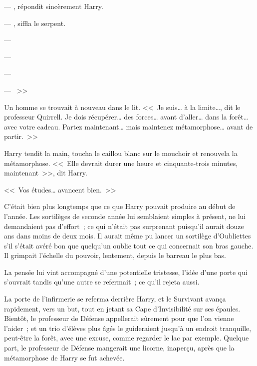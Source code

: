 --- , répondit sincèrement Harry.

--- , siffla le serpent. 

--- 

--- 

--- 

--- ~>>

Un homme se trouvait à nouveau dans le lit. <<~Je suis… à la limite…, dit le professeur Quirrell. Je dois récupérer… des forces… avant d'aller… dans la forêt… avec votre cadeau. Partez maintenant… mais maintenez métamorphose… avant de partir.~>>

Harry tendit la main, toucha le caillou blanc sur le mouchoir et renouvela la métamorphose. <<~Elle devrait durer une heure et cinquante-trois minutes, maintenant~>>, dit Harry.

<<~Vos études… avancent bien.~>>

C'était bien plus longtemps que ce que Harry pouvait produire au début de l'année. Les sortilèges de seconde année lui semblaient simples à présent, ne lui demandaient pas d'effort~; ce qui n'était pas surprenant puisqu'il aurait douze ans dans moins de deux mois. Il aurait même pu lancer un sortilège d'Oubliettes s'il s'était avéré bon que quelqu'un oublie tout ce qui concernait son bras gauche. Il grimpait l'échelle du pouvoir, lentement, depuis le barreau le plus bas.

La pensée lui vint accompagné d'une potentielle tristesse, l'idée d'une porte qui s'ouvrait tandis qu'une autre se refermait~; ce qu'il rejeta aussi.

\later

La porte de l'infirmerie se referma derrière Harry, et le Survivant avança rapidement, vers un but, tout en jetant sa Cape d'Invisibilité sur ses épaules. Bientôt, le professeur de Défense appellerait sûrement pour que l'on vienne l'aider~; et un trio d'élèves plus âgés le guideraient jusqu'à un endroit tranquille, peut-être la forêt, avec une excuse, comme regarder le lac par exemple. Quelque part, le professeur de Défense mangerait une licorne, inaperçu, après que la métamorphose de Harry se fut achevée.

